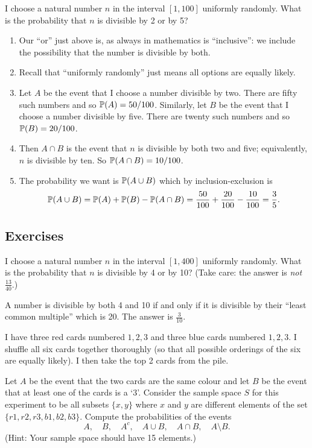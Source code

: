 \begin{example}
I choose a natural number $n$ in the interval $[1,100]$ uniformly randomly. What is the probability that $n$ is divisible by 2 or by 5?
\begin{enumerate}
    \item Our ``or'' just above is, as always in mathematics is ``inclusive'': we include the possibility that the number is divisible by both. 
    \item Recall that ``uniformly randomly'' just means all options are equally likely.
    \item Let $A$ be the event that I choose a number divisible by two. There are fifty such numbers and so ${\mathbb P}(A) = 50/100$. Similarly, let $B$ be the event that I choose a number divisible by five. There are twenty such numbers and so ${\mathbb P}(B) = 20/100$. 
    \item Then $A \cap B$ is the event that $n$ is divisible by both two and five; equivalently, $n$ is divisible by ten. So ${\mathbb P}(A \cap B) = 10/100$. 
    \item The probability we want is ${\mathbb P}(A \cup B)$ which by inclusion-exclusion is 
    \[
     {\mathbb P}(A \cup B) = {\mathbb P}(A) + {\mathbb P}(B) - {\mathbb P}(A \cap B) = 
      \frac{50}{100} + \frac{20}{100} - \frac{10}{100} = \frac35. 
    \]
\end{enumerate}
\end{example}

\subsection{Exercises}
\begin{exer}
I choose a natural number $n$ in the interval $[1,400]$ uniformly randomly. What is the probability that $n$ is divisible by 4 or by 10?  (Take care: the answer is \emph{not} $\frac{13}{40}$.) 
\end{exer} 

\begin{sol}
A number is divisible by both 4 and 10 if and only if it is divisible by their ``least common multiple'' which is 20.  The answer is $\frac{3}{10}$. 
\end{sol}

\begin{exer} 
I have three red cards numbered $1,2,3$ and three blue cards numbered $1,2,3$.  I shuffle all six cards together thoroughly (so that all possible orderings of the six are equally likely). I then take the top 2 cards from the pile. 

Let $A$ be the event that the two cards are the same colour and let $B$ be the event that at least one of the cards is a `3'. Consider the sample space $S$ for this experiment to be all subsets $\{ x,y \}$ where $x$ and $y$ are different elements of the set $\{ r1, r2, r3, b1, b2, b3\}$. Compute the probabilities of the events
 \[
   A,\quad B,\quad A^c,\quad A \cup B,\quad A \cap B,\quad A \setminus B. 
 \]
(Hint: Your sample space should have 15 elements.) 
\end{exer}